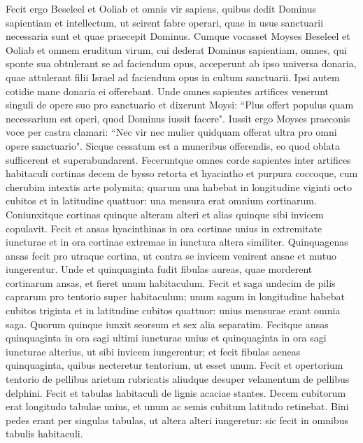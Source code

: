 \begin{biblechapter}  
\verse Fecit ergo Beseleel et Ooliab et omnis vir sapiens, quibus dedit Dominus sapientiam et intellectum, ut scirent fabre operari, quae in usus sanctuarii necessaria sunt et quae praecepit Dominus. 
\verse Cumque vocasset Moyses Beseleel et Ooliab et omnem eruditum virum, cui dederat Dominus sapientiam, omnes, qui sponte sua obtulerant se ad faciendum opus, 
\verse acceperunt ab ipso universa donaria, quae attulerant filii Israel ad faciendum opus in cultum sanctuarii. Ipsi autem cotidie mane donaria ei offerebant. 
\verse Unde omnes sapientes artifices venerunt singuli de opere suo pro sanctuario  
\verse et dixerunt Moysi: “Plus offert populus quam necessarium est operi, quod Dominus iussit facere". 
\verse Iussit ergo Moyses praeconis voce per castra clamari: “Nec vir nec mulier quidquam offerat ultra pro omni opere sanctuario". Sicque cessatum est a muneribus offerendis, 
\verse eo quod oblata sufficerent et superabundarent. 
\verse Feceruntque omnes corde sapientes inter artifices habitaculi cortinas decem de bysso retorta et hyacintho et purpura coccoque, cum cherubim intextis arte polymita; 
\verse quarum una habebat in longitudine viginti octo cubitos et in latitudine quattuor: una mensura erat omnium cortinarum. 
\verse Coniunxitque cortinas quinque alteram alteri et alias quinque sibi invicem copulavit. 
\verse Fecit et ansas hyacinthinas in ora cortinae unius in extremitate iuncturae et in ora cortinae extremae in iunctura altera similiter. 
\verse Quinquagenas ansas fecit pro utraque cortina, ut contra se invicem venirent ansae et mutuo iungerentur. 
\verse Unde et quinquaginta fudit fibulas aureas, quae morderent cortinarum ansas, et fieret unum habitaculum. 
\verse Fecit et saga undecim de pilis caprarum pro tentorio super habitaculum; 
\verse unum sagum in longitudine habebat cubitos triginta et in latitudine cubitos quattuor: unius mensurae erant omnia saga. 
\verse Quorum quinque iunxit seorsum et sex alia separatim. 
\verse Fecitque ansas quinquaginta in ora sagi ultimi iuncturae unius et quinquaginta in ora sagi iuncturae alterius, ut sibi invicem iungerentur; 
\verse et fecit fibulas aeneas quinquaginta, quibus necteretur tentorium, ut esset unum. 
\verse Fecit et opertorium tentorio de pellibus arietum rubricatis aliudque desuper velamentum de pellibus delphini. 
\verse Fecit et tabulas habitaculi de lignis acaciae stantes. 
\verse Decem cubitorum erat longitudo tabulae unius, et unum ac semis cubitum latitudo retinebat.  
\verse Bini pedes erant per singulas tabulas, ut altera alteri iungeretur: sic fecit in omnibus tabulis habitaculi. 

\end{biblechapter}
